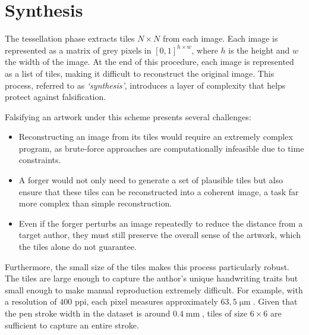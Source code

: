 \section{Synthesis}
\begin{modified}
The tessellation phase extracts tiles $N\times N$ from each image. Each image is represented as a matrix of grey pixels in $\left[0,1\right]^{h \times w}$, where $h$ is the height and $w$ the width of the image. At the end of this procedure, each image is represented as a list of tiles, making it difficult to reconstruct the original image. This process, referred to as \textit{‘synthesis’}, introduces a layer of complexity that helps protect against falsification.
\end{modified}

\begin{toReview}
\noindent Falsifying an artwork under this scheme presents several challenges:
\begin{itemize}
	\item Reconstructing an image from its tiles would require an extremely complex program, as brute-force approaches are computationally infeasible due to time constraints.
	\item A forger would not only need to generate a set of plausible tiles but also ensure that these tiles can be reconstructed into a coherent image, a task far more complex than simple reconstruction.
	\item Even if the forger perturbs an image repeatedly to reduce the distance from a target author, they must still preserve the overall sense of the artwork, which the tiles alone do not guarantee.
\end{itemize}
	\noindent Furthermore, the small size of the tiles makes this process particularly robust. The tiles are large enough to capture the author’s unique handwriting traits but small enough to make manual reproduction extremely difficult. For example, with a resolution of $400$ \gls{ppi}, each pixel measures approximately $63,5\operatorname{\mathrm{\mu m}}$. Given that the pen stroke width in the dataset is around $0.4\operatorname{\mathrm{mm}}$, tiles of size $6\times6$ are sufficient to capture an entire stroke.
\end{toReview}

